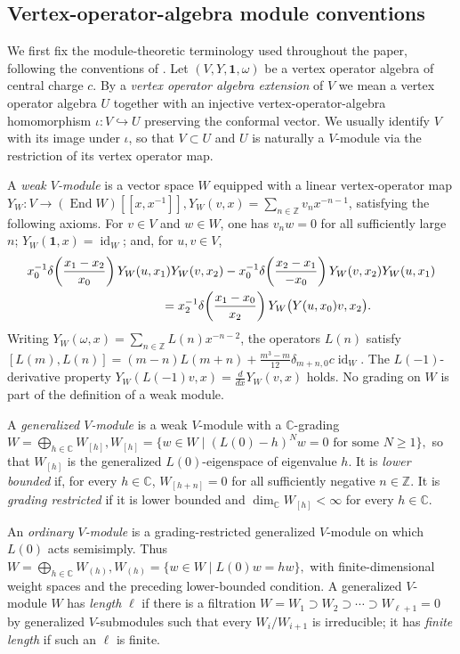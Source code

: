 \documentclass[12pt,leqno]{amsart}
\numberwithin{equation}{section} \newtheorem{thm}{Theorem}[section] \newtheorem{lem}[thm]{Lemma} \newtheorem{ex}[thm]{Example} \newtheorem{prop}[thm]{Proposition} \newtheorem{cor}[thm]{Corollary} \newtheorem{defi}[thm]{Definition} \newtheorem{rmk}[thm]{Remark} \newtheorem{notation}[thm]{Notation}
\newcommand{\End}{\operatorname{End}}
\newcommand{\one}{\mathbf{1}}
\newcommand{\id}{\operatorname{id}}
\def\Z{\mathbb{Z}} \def\N{\mathbb{N}} \def\A{\mathbb{A}} \def\C{\mathbb{C}} \def\R{\mathbb{R}} \def\Q{\mathbb{Q}} \def\F{\mathbb{F}}
\begin{document}
\subsection{Vertex-operator-algebra module conventions}
\label{subsec:module-conventions}

We first fix the module-theoretic terminology used throughout the paper, following the conventions of \cite[Section~2.1]{CJORY}. Let $(V,Y,\one,\omega)$ be a vertex operator algebra of central charge $c$. By a \emph{vertex operator algebra extension} of $V$ we mean a vertex operator algebra $U$ together with an injective vertex-operator-algebra homomorphism $\iota:V\hookrightarrow U$ preserving the conformal vector. We usually identify $V$ with its image under $\iota$, so that $V\subset U$ and $U$ is naturally a $V$-module via the restriction of its vertex operator map.

A \emph{weak $V$-module} is a vector space $W$ equipped with a linear vertex-operator map \(Y_W:V\longrightarrow(\End W)[[x,x^{-1}]], Y_W(v,x)=\sum_{n\in\Z}v_nx^{-n-1}\), satisfying the following axioms. For $v\in V$ and $w\in W$, one has $v_nw=0$ for all sufficiently large $n$; $Y_W(\one,x)=\id_W$; and, for $u,v\in V$,
\begin{align*}
&x_0^{-1}\delta\!\left(\frac{x_1-x_2}{x_0}\right)
 Y_W(u,x_1)Y_W(v,x_2)
-x_0^{-1}\delta\!\left(\frac{x_2-x_1}{-x_0}\right)
 Y_W(v,x_2)Y_W(u,x_1)\\
&\hspace{38mm}=
 x_2^{-1}\delta\!\left(\frac{x_1-x_0}{x_2}\right)
 Y_W\bigl(Y(u,x_0)v,x_2\bigr).
\end{align*}
Writing \(Y_W(\omega,x)=\sum_{n\in\Z}L(n)x^{-n-2}\), the operators $L(n)$ satisfy \([L(m),L(n)]=(m-n)L(m+n)+\frac{m^3-m}{12}\delta_{m+n,0}c\id_W\). The $L(-1)$-derivative property \(Y_W(L(-1)v,x)=\frac{d}{dx}Y_W(v,x)\) holds. No grading on $W$ is part of the definition of a weak module.

A \emph{generalized $V$-module} is a weak $V$-module with a $\C$-grading \(W=\bigoplus_{h\in\C}W_{[h]},W_{[h]}=\{w\in W\mid(L(0)-h)^Nw=0\text{ for some }N\ge1\},\) so that $W_{[h]}$ is the generalized $L(0)$-eigenspace of eigenvalue $h$. It is \emph{lower bounded} if, for every $h\in\C$, \(W_{[h+n]}=0\) for all sufficiently negative $n\in\Z$. It is \emph{grading restricted} if it is lower bounded and \(\dim_\C W_{[h]}<\infty\) for every $h\in\C$.

An \emph{ordinary $V$-module} is a grading-restricted generalized $V$-module on which $L(0)$ acts semisimply. Thus \(W=\bigoplus_{h\in\C}W_{(h)},W_{(h)}=\{w\in W\mid L(0)w=hw\},\) with finite-dimensional weight spaces and the preceding lower-bounded condition. A generalized $V$-module $W$ has \emph{length} $\ell$ if there is a filtration \(W=W_1\supset W_2\supset\cdots\supset W_{\ell+1}=0\) by generalized $V$-submodules such that every $W_i/W_{i+1}$ is irreducible; it has \emph{finite length} if such an $\ell$ is finite.
\end{document}
